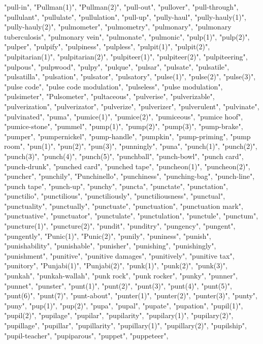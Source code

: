 "pull-in",
"Pullman(1)",
"Pullman(2)",
"pull-out",
"pullover",
"pull-through",
"pullulant",
"pullulate",
"pullulation",
"pull-up",
"pully-haul",
"pully-hauly(1)",
"pully-hauly(2)",
"pulmometer",
"pulmometry",
"pulmonary",
"pulmonary tuberculosis",
"pulmonary vein",
"pulmonate",
"pulmonic",
"pulp(1)",
"pulp(2)",
"pulper",
"pulpify",
"pulpiness",
"pulpless",
"pulpit(1)",
"pulpit(2)",
"pulpitarian(1)",
"pulpitarian(2)",
"pulpiteer(1)",
"pulpiteer(2)",
"pulpiteering",
"pulpous",
"pulpwood",
"pulpy",
"pulque",
"pulsar",
"pulsate",
"pulsatile",
"pulsatilla",
"pulsation",
"pulsator",
"pulsatory",
"pulse(1)",
"pulse(2)",
"pulse(3)",
"pulse code",
"pulse code modulation",
"pulseless",
"pulse modulation",
"pulsimeter",
"Pulsometer",
"pultaceous",
"pulverise",
"pulverizable",
"pulverization",
"pulverizator",
"pulverize",
"pulverizer",
"pulverulent",
"pulvinate",
"pulvinated",
"puma",
"pumice(1)",
"pumice(2)",
"pumiceous",
"pumice hoof",
"pumice-stone",
"pummel",
"pump(1)",
"pump(2)",
"pump(3)",
"pump-brake",
"pumper",
"pumpernickel",
"pump-handle",
"pumpkin",
"pump-priming",
"pump room",
"pun(1)",
"pun(2)",
"pun(3)",
"punningly",
"puna",
"punch(1)",
"punch(2)",
"punch(3)",
"punch(4)",
"punch(5)",
"punchball",
"punch-bowl",
"punch card",
"punch-drunk",
"punched card",
"punched tape",
"puncheon(1)",
"puncheon(2)",
"puncher",
"punchily",
"Punchinello",
"punchiness",
"punching-bag",
"punch-line",
"punch tape",
"punch-up",
"punchy",
"puncta",
"punctate",
"punctation",
"punctilio",
"punctilious",
"punctiliously",
"punctiliousness",
"punctual",
"punctuality",
"punctually",
"punctuate",
"punctuation",
"punctuation mark",
"punctuative",
"punctuator",
"punctulate",
"punctulation",
"punctule",
"punctum",
"puncture(1)",
"puncture(2)",
"pundit",
"punditry",
"pungency",
"pungent",
"pungently",
"Punic(1)",
"Punic(2)",
"punily",
"puniness",
"punish",
"punishability",
"punishable",
"punisher",
"punishing",
"punishingly",
"punishment",
"punitive",
"punitive damages",
"punitively",
"punitive tax",
"punitory",
"Punjabi(1)",
"Punjabi(2)",
"punk(1)",
"punk(2)",
"punk(3)",
"punkah",
"punkah-wallah",
"punk rock",
"punk rocker",
"punky",
"punner",
"punnet",
"punster",
"punt(1)",
"punt(2)",
"punt(3)",
"punt(4)",
"punt(5)",
"punt(6)",
"punt(7)",
"punt-about",
"punter(1)",
"punter(2)",
"punter(3)",
"punty",
"puny",
"pup(1)",
"pup(2)",
"pupa",
"pupal",
"pupate",
"pupation",
"pupil(1)",
"pupil(2)",
"pupilage",
"pupilar",
"pupilarity",
"pupilary(1)",
"pupilary(2)",
"pupillage",
"pupillar",
"pupillarity",
"pupillary(1)",
"pupillary(2)",
"pupilship",
"pupil-teacher",
"pupiparous",
"puppet",
"puppeteer",
